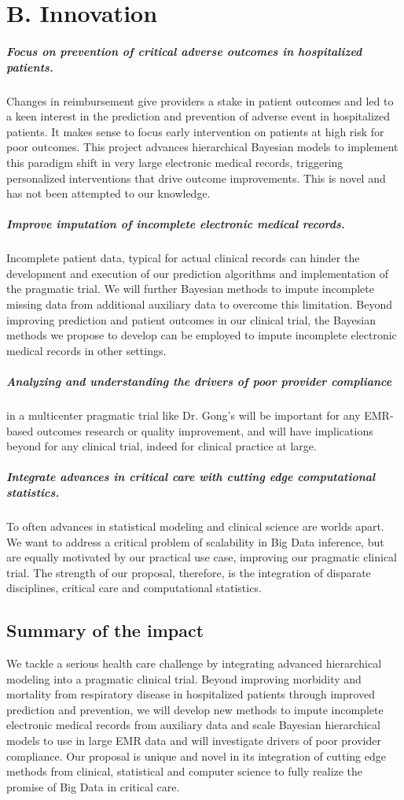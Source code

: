 \documentclass[11pt,notitlepage]{article}
\begin{document}
\section*{B. Innovation}
\subparagraph*{Focus on prevention of critical adverse outcomes in hospitalized patients.}
Changes in reimbursement give providers a stake in patient outcomes and led to a keen interest in the prediction and prevention of adverse event in hospitalized patients. It makes sense to focus early intervention on patients at high risk for poor outcomes. This project advances hierarchical Bayesian models to implement this paradigm shift in very large electronic medical records, triggering personalized interventions that drive outcome improvements. This is novel and has not been attempted to our knowledge.

\subparagraph*{Improve imputation of incomplete electronic medical records.}
Incomplete patient data, typical for actual clinical records can hinder the development and execution of our prediction algorithms and implementation of the pragmatic trial. We will further Bayesian methods to impute incomplete missing data from additional auxiliary data to overcome this limitation. Beyond improving prediction and patient outcomes in our clinical trial, the Bayesian methods we propose to develop can be employed to impute incomplete electronic medical records in other settings.

\subparagraph{Analyzing and understanding the drivers of poor provider compliance} in a multicenter pragmatic trial like Dr. Gong's will be important for any EMR-based outcomes research or quality improvement, and will have implications beyond for any clinical trial, indeed for clinical practice at large.

\subparagraph*{Integrate advances in critical care with cutting edge computational statistics.}
To often advances in statistical modeling and clinical science are worlds apart. We want to address a critical problem of scalability in Big Data inference, but are equally motivated by our practical use case, improving our pragmatic clinical trial. The strength of our proposal, therefore, is the integration of disparate disciplines, critical care and computational statistics. 

\subsection*{Summary of the impact}
We tackle a serious health care challenge by integrating advanced hierarchical modeling into a pragmatic clinical trial. Beyond improving morbidity and mortality from respiratory disease in hospitalized patients through improved prediction and prevention, we will develop new methods to impute incomplete electronic medical records from auxiliary data and scale Bayesian hierarchical models to use in large EMR data and will investigate drivers of poor provider compliance. Our proposal is unique and novel in its integration of cutting edge methods from clinical, statistical and computer science to fully realize the promise of Big Data in critical care.
\end{document}
